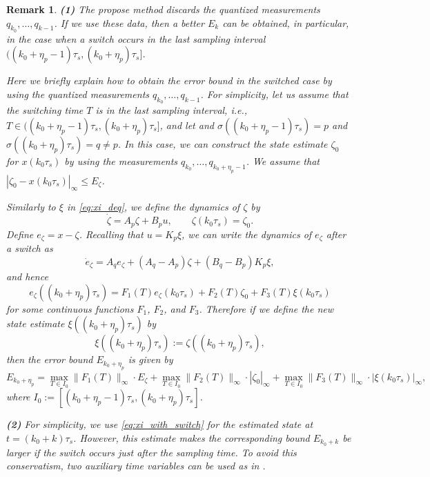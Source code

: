 \documentclass[letterpaper, 11pt, onecolumn]{ieeeconf}  \IEEEoverridecommandlockouts
\newtheorem{remark}[theorem]{Remark}
\begin{document}
\begin{remark}

{\bf (1)}
The propose method discards the quantized measurements
$q_{k_0},\dots,q_{k-1}$. If we use these data, then
a better $E_k$ can be obtained, in particular, 
in the case when a switch occurs in the last sampling interval
$((k_0+\eta_p-1)\tau_s, (k_0+\eta_p) \tau_s]$.

Here we briefly explain how to obtain the error bound
in the switched case
by using the quantized measurements
$q_{k_0},\dots,q_{k-1}$. 
For simplicity, let us assume that
the switching time $T$ is in the last sampling interval, i.e., 
$T \in ((k_0+\eta_p-1)\tau_s, (k_0+\eta_p) \tau_s]$, and let
and $\sigma((k_0+\eta_p-1)\tau_s) = p$ and 
$\sigma((k_0+\eta_p)\tau_s) = q \not= p$.
In this case, we can construct the state estimate $\zeta_0$ for $x(k_0\tau_s)$
by using the measurements $q_{k_0},\dots, q_{k_0+\eta_p-1}$.
We assume that $|\zeta_0 - x(k_0\tau_s)|_{\infty} \leq E_{\zeta}$.

Similarly to $\xi$ in \eqref{eq:xi_deq}, we define the dynamics of $\zeta$ by
\begin{equation*}
\dot \zeta = A_p \zeta + B_pu,\qquad \zeta(k_0\tau_s) = \zeta_0.
\end{equation*} 
Define $e_{\zeta} = x - \zeta$.
Recalling that $u = K_p \xi$, we can write 
the dynamics of $e_{\zeta}$ after a switch as
\begin{equation*}
\dot e_{\zeta} = 
A_q e_{\zeta} + (A_q - A_p) \zeta + (B_q - B_p) K_p \xi,
\end{equation*}
and hence
\begin{equation*}
e_{\zeta}((k_0+\eta_p)\tau_s) = 
F_{1}(T) e_{\zeta}(k_0\tau_s) + 
F_{2}(T) \zeta_0 +
F_{3}(T) \xi(k_0\tau_s)
\end{equation*}
for some continuous functions $F_1$, $F_2$, and $F_3$.
Therefore if we define the new state estimate $\xi((k_0+\eta_p)\tau_s)$ by
\begin{equation*}
\xi((k_0+\eta_p)\tau_s) := \zeta((k_0+\eta_p)\tau_s),
\end{equation*}
then the error bound $E_{k_0+\eta_p}$ is
given by
\begin{equation*}
E_{k_0+\eta_p} = 
\max_{T \in I_{0}}
\|F_1(T)\|_{\infty} \cdot E_{\zeta} + 
\max_{T \in I_{0}}
\|F_2(T)\|_{\infty} \cdot |\zeta_0|_{\infty} +
\max_{T \in I_{0}}
\|F_3(T)\|_{\infty} \cdot |\xi(k_0\tau_s)|_{\infty},
\end{equation*}
where $I_{0} := [(k_0+\eta_p-1)\tau_s, (k_0+\eta_p) \tau_s]$.




{\bf (2)}
For simplicity, we use \eqref{eq:xi_with_switch} 
for the estimated state at $t = (k_0+k)\tau_s$.
However, this estimate makes the corresponding bound $E_{k_0+k}$
be larger if the switch occurs just after the sampling time.
To avoid this conservatism, 
two auxiliary time variables can be used as in \cite[Section 4.2]{Liberzon2014}.

\end{remark}
\end{document}
